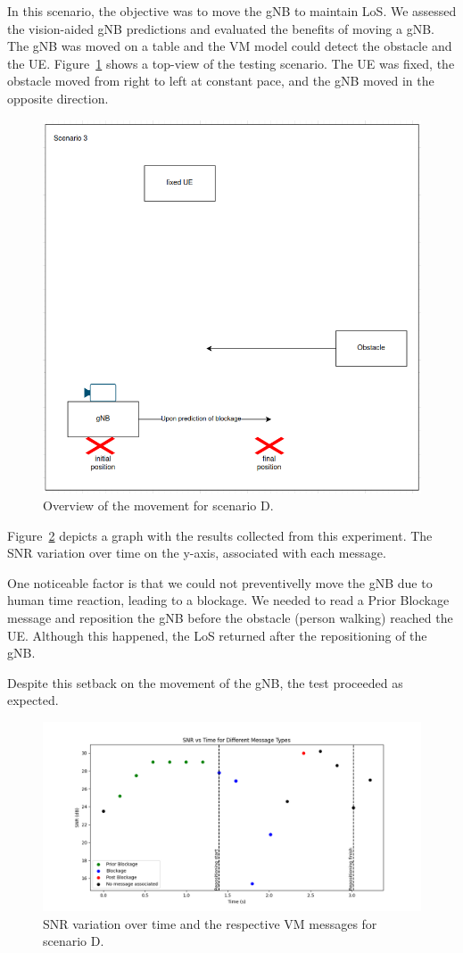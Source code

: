 In this scenario, the objective was to move the gNB to maintain LoS\@.
We assessed the vision-aided gNB predictions and evaluated the benefits of moving a gNB\@.
The gNB was moved on a table and the VM model could detect the obstacle and the UE\@.
Figure~\ref{fig:test_movgnb} shows a top-view of the testing scenario.
The UE was fixed, the obstacle moved from right to left at constant pace, and the gNB moved in the opposite direction.

\begin{figure}[H]
    \centering
    \includegraphics[width=0.5\linewidth]{figures/scenario3}
    \caption{Overview of the movement for scenario D.}
    \label{fig:test_movgnb}
\end{figure}

Figure~\ref{fig:results_3} depicts a graph with the results collected from this experiment.
The SNR variation over time on the y-axis, associated with each message.

One noticeable factor is that we could not preventivelly move the gNB due to human time reaction, leading to a blockage.
We needed to read a Prior Blockage message and reposition the gNB before the obstacle (person walking) reached the UE\@.
Although this happened, the LoS returned after the repositioning of the gNB\@.

Despite this setback on the movement of the gNB, the test proceeded as expected.


\begin{figure}[H]
    \centering
    \includegraphics[width=\linewidth]{figures/results_3}
    \caption{SNR variation over time and the respective VM messages for scenario D.}
    \label{fig:results_3}
\end{figure}

